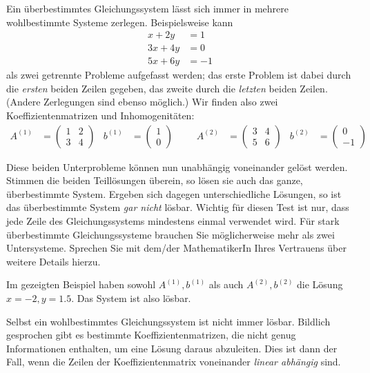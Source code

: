 \begin{hintbox}
Ein überbestimmtes Gleichungssystem lässt sich immer in mehrere wohlbestimmte Systeme zerlegen. Beispielsweise kann
\begin{align*}
	 x + 2y &= 1 \\
	3x + 4y &= 0 \\
	5x + 6y &= -1
\end{align*}
als zwei getrennte Probleme aufgefasst werden; das erste Problem ist dabei durch die \emph{ersten} beiden Zeilen gegeben, das zweite durch die \emph{letzten} beiden Zeilen. (Andere Zerlegungen sind ebenso möglich.) Wir finden also zwei Koeffizientenmatrizen und Inhomogenitäten:
\begin{align*}
	A^{(1)} &= \begin{pmatrix}
		1 & 2 \\ 3 & 4
	\end{pmatrix}
	&
	b^{(1)} &= \begin{pmatrix}
		1 \\ 0
	\end{pmatrix}
&&&
	A^{(2)} &= \begin{pmatrix}
		3 & 4 \\ 5 & 6
	\end{pmatrix}
	&
	b^{(2)} &= \begin{pmatrix}
		0 \\ -1
	\end{pmatrix}
\end{align*}

Diese beiden Unterprobleme können nun unabhängig voneinander gelöst werden. Stimmen die beiden Teillösungen überein, so lösen sie auch das ganze, überbestimmte System.  Ergeben sich dagegen unterschiedliche Lösungen, so ist das überbestimmte System \emph{gar nicht} lösbar. Wichtig für diesen Test ist nur, dass jede Zeile des Gleichungssystems mindestens einmal verwendet wird. Für stark überbestimmte Gleichungssysteme brauchen Sie möglicherweise mehr als zwei Untersysteme. Sprechen Sie mit dem/der MathematikerIn Ihres Vertrauens über weitere Details hierzu.

Im gezeigten Beispiel haben sowohl $A^{(1)}, b^{(1)}$ als auch $A^{(2)}, b^{(2)}$ die Lösung $x =-2, y= 1.5$. Das System ist also lösbar.
\end{hintbox}

Selbst ein wohlbestimmtes Gleichungssystem ist nicht immer lösbar. Bildlich gesprochen gibt es bestimmte Koeffizientenmatrizen, die nicht genug Informationen enthalten, um eine Lösung daraus abzuleiten. Dies ist dann der Fall, wenn die Zeilen der Koeffizientenmatrix voneinander \emph{linear abhängig} sind.

